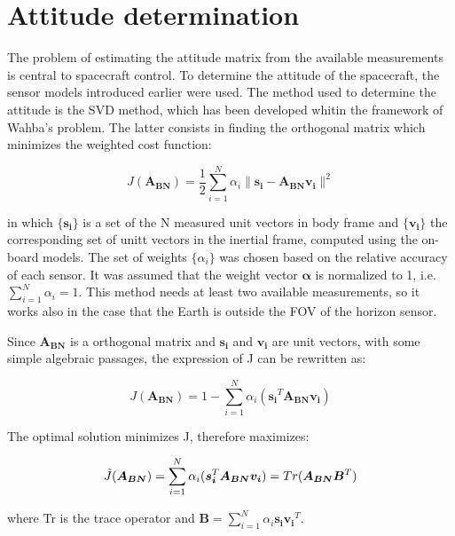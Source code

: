 \section{Attitude determination}
\label{subsec:attitude_det}

The problem of estimating the attitude matrix from the available measurements is central to spacecraft control. To determine the attitude of the spacecraft, the sensor models introduced earlier were used. The method used to determine the attitude is the SVD method, which has been developed whitin the framework of Wahba's problem. The latter consists in finding the orthogonal matrix which minimizes the weighted cost function:

\begin{equation}
    J(\boldsymbol{A_{BN}})=\frac{1}{2}\sum_{i=1}^N\alpha_i\lVert \boldsymbol{s_i} - \boldsymbol{A_{BN}v_i} \rVert^2
\end{equation}

in which $\{\boldsymbol{s_i}\}$ is a set of the N measured unit vectors in body frame and $\{\boldsymbol{v_i}\}$ the corresponding set of unitt vectors in the inertial frame, computed using the on-board models. The set of weights $\{\alpha_i\}$ was chosen based on the relative accuracy of each sensor. It was assumed that the weight vector $\boldsymbol{\alpha}$ is normalized to 1, i.e. $\sum_{i=1}^N\alpha_i=1$. This method needs at least two available measurements, so it works also in the case that the Earth is outside the FOV of the horizon sensor.

Since $\boldsymbol{A_{BN}}$ is a orthogonal matrix and $\boldsymbol{s_i}$ and $\boldsymbol{v_i}$ are unit vectors, with some simple algebraic passages, the expression of J can be rewritten as:

\begin{equation}
    J(\boldsymbol{A_{BN}})=1-\sum_{i=1}^N\alpha_i(\boldsymbol{s_i}^T\boldsymbol{A_{BN}}\boldsymbol{v_i})
\end{equation}

The optimal solution minimizes J, therefore maximizes:

\begin{equation}
    \Tilde{J}(\boldsymbol{A_{BN}})=\sum_{i=1}^N\alpha_i(\boldsymbol{s_i}^T\boldsymbol{A_{BN}}\boldsymbol{v_i})=Tr(\boldsymbol{A_{BN}}\boldsymbol{B}^T)
\end{equation}

where Tr is the trace operator and $\boldsymbol{B}=\sum_{i=1}^N\alpha_i\boldsymbol{s_iv_i}^T$.

